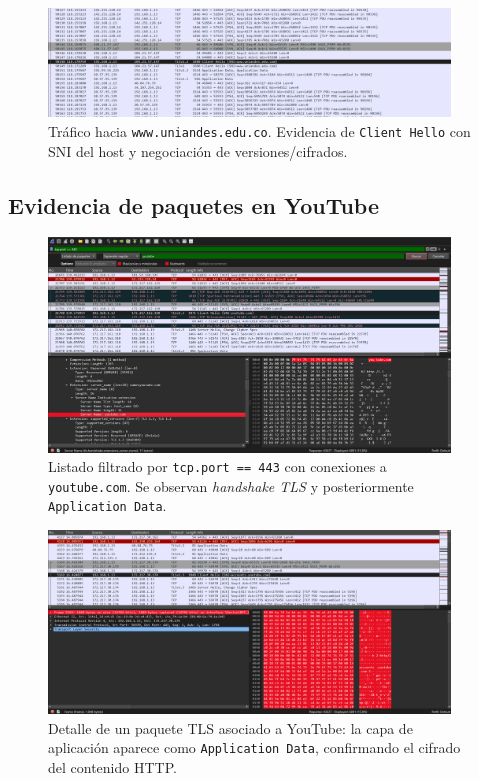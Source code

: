 \documentclass[10pt]{article}
\begin{document}
\begin{figure}[H]
    \centering
    \includegraphics[width=0.95\textwidth]{lab-02-screenshots/8.5-HTTPS-uniandes.png}
    \caption{Tráfico hacia \texttt{www.uniandes.edu.co}. Evidencia de \texttt{Client Hello} con SNI del host y negociación de versiones/cifrados.}
\end{figure}

\subsection*{Evidencia de paquetes en YouTube}

\begin{figure}[H]
    \centering
    \includegraphics[width=0.95\textwidth]{lab-02-screenshots/8.5-Packets-Youtube.png}
    \caption{Listado filtrado por \texttt{tcp.port == 443} con conexiones a \texttt{youtube.com}. Se observan \textit{handshake TLS} y posteriormente \texttt{Application Data}.}
\end{figure}

\begin{figure}[H]
    \centering
    \includegraphics[width=0.95\textwidth]{lab-02-screenshots/8.5-Paquete-Youtube.png}
    \caption{Detalle de un paquete TLS asociado a YouTube: la capa de aplicación aparece como \texttt{Application Data}, confirmando el cifrado del contenido HTTP.}
\end{figure}
\end{document}
